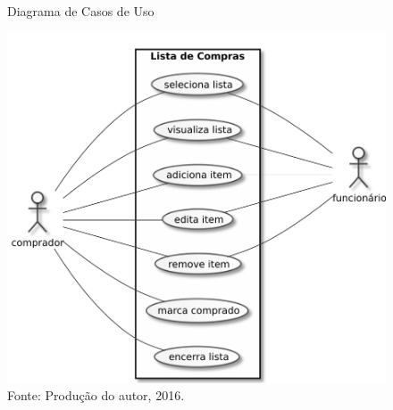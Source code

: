 \documentclass[
	draft,
	12pt,
	openright,
	oneside, %
	a4paper,
	chapter=TITLE,
	section=TITLE,
	english,
	brazil %
	]{abntex2-udesc}
\begin{document}
\begin{figure}[h]
\caption{Diagrama de Casos de Uso}\label{fig:usecase}
\centering
\includegraphics[width=\textwidth,keepaspectratio]{figures/usecase.pdf}
\caption*{\footnotesize Fonte: Produção do autor, 2016.}
\end{figure}

\postextual



\end{document}
